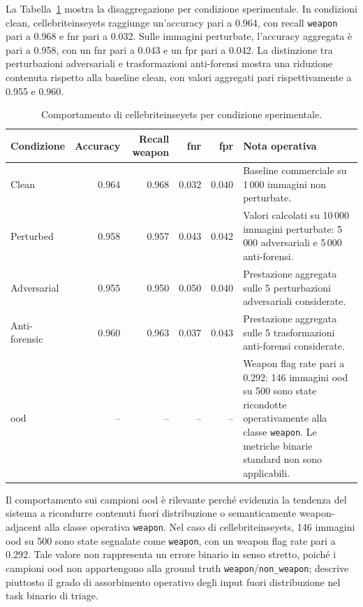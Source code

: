 La Tabella~\ref{tab:results-cellebrite-condition-metrics} mostra la
disaggregazione per condizione sperimentale. In condizioni clean,
\gls{cellebriteinseyets} raggiunge un'accuracy pari a 0.964, con recall
\texttt{weapon} pari a 0.968 e \gls{fnr} pari a 0.032. Sulle immagini perturbate,
l'accuracy aggregata è pari a 0.958, con un \gls{fnr} pari a 0.043 e un
\gls{fpr} pari a 0.042. La distinzione tra perturbazioni adversariali e
trasformazioni anti-forensi mostra una riduzione contenuta rispetto alla baseline
clean, con valori aggregati pari rispettivamente a 0.955 e 0.960.

\begin{table}[H]
\centering
\caption{Comportamento di \gls{cellebriteinseyets} per condizione sperimentale.}
\label{tab:results-cellebrite-condition-metrics}
\small
\begin{tabularx}{\textwidth}{@{}l r r r r X@{}}
\toprule
\textbf{Condizione} &
\textbf{Accuracy} &
\textbf{Recall weapon} &
\textbf{\gls{fnr}} &
\textbf{\gls{fpr}} &
\textbf{Nota operativa} \\
\midrule

Clean &
0.964 &
0.968 &
0.032 &
0.040 &
Baseline commerciale su 1\,000 immagini non perturbate. \\

Perturbed &
0.958 &
0.957 &
0.043 &
0.042 &
Valori calcolati su 10\,000 immagini perturbate: 5\,000 adversariali e 5\,000
anti-forensi. \\

Adversarial &
0.955 &
0.950 &
0.050 &
0.040 &
Prestazione aggregata sulle 5 perturbazioni adversariali considerate. \\
Anti-forensic &
0.960 &
0.963 &
0.037 &
0.043 &
Prestazione aggregata sulle 5 trasformazioni anti-forensi considerate. \\

\gls{ood} &
-- &
-- &
-- &
-- &
Weapon flag rate pari a 0.292: 146 immagini \gls{ood} su 500 sono state
ricondotte operativamente alla classe \texttt{weapon}. Le metriche binarie
standard non sono applicabili. \\

\bottomrule
\end{tabularx}
\end{table}

Il comportamento sui campioni \gls{ood} è rilevante perché evidenzia la tendenza
del sistema a ricondurre contenuti fuori distribuzione o semanticamente
weapon-adjacent alla classe operativa \texttt{weapon}. Nel caso di
\gls{cellebriteinseyets}, 146 immagini \gls{ood} su 500 sono state segnalate come
\texttt{weapon}, con un weapon flag rate pari a 0.292. Tale valore non rappresenta
un errore binario in senso stretto, poiché i campioni \gls{ood} non appartengono
alla ground truth \texttt{weapon}/\texttt{non\_weapon}; descrive piuttosto il
grado di assorbimento operativo degli input fuori distribuzione nel task binario
di triage.

